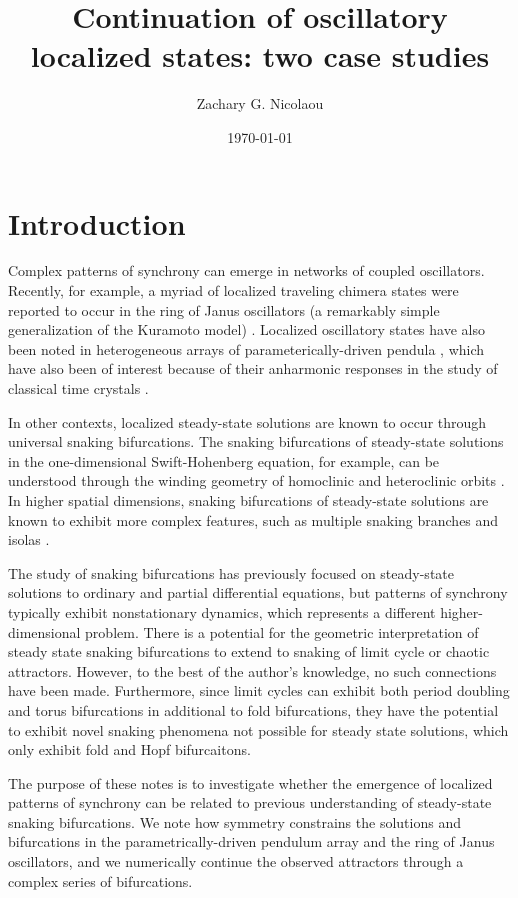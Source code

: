 \documentclass[aps,pre,amsmath,amssymb,floatfix,onecolumn,notitlepage,10pt]{revtex4-1}
\begin{document}
\title{Continuation of oscillatory localized states: two case studies}
\author{Zachary G. Nicolaou}
\date{\today}

\maketitle
\tableofcontents

\section{Introduction}
Complex patterns of synchrony can emerge in networks of coupled oscillators.  Recently, for example, a myriad of localized traveling chimera states were reported to occur in the ring of Janus oscillators (a remarkably simple generalization of the Kuramoto model) \cite{2019_Nicolaou}. Localized oscillatory states have also been noted in heterogeneous arrays of parameterically-driven pendula \cite{2021_Nicolaou_1}, which have also been of interest because of their anharmonic responses in the study of classical time crystals \cite{2021_Nicolaou_2}.

In other contexts, localized steady-state solutions are known to occur through universal snaking bifurcations. The snaking bifurcations of steady-state solutions in the one-dimensional Swift-Hohenberg equation, for example, can be understood through the winding geometry of homoclinic and heteroclinic orbits \cite{2006_burke, 2009_beck}. In higher spatial dimensions, snaking bifurcations of steady-state solutions are known to exhibit  more complex features, such as multiple snaking branches and isolas \cite{2019_bramburger,2020_bramburger}.


The study of snaking bifurcations has previously focused on steady-state solutions to ordinary and partial differential equations, but patterns of synchrony typically exhibit nonstationary dynamics, which represents a different higher-dimensional problem.  There is a potential for the geometric interpretation of steady state snaking bifurcations to extend to snaking of limit cycle or chaotic attractors. However, to the best of the author's knowledge, no such connections have been made.  Furthermore, since limit cycles can exhibit both period doubling and torus bifurcations in additional to fold bifurcations, they have the potential to exhibit novel snaking phenomena not possible for steady state solutions, which only exhibit fold and Hopf bifurcaitons.

The purpose of these notes is to investigate whether the emergence of localized patterns of synchrony can be related to previous understanding of steady-state snaking bifurcations. We note how symmetry constrains the solutions and bifurcations in the parametrically-driven pendulum array and the ring of Janus oscillators, and we numerically continue the observed attractors through a complex series of bifurcations.
\end{document}

